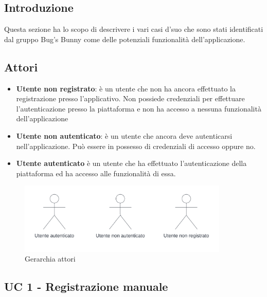 \subsection{Introduzione}
Questa sezione ha lo scopo di descrivere i vari casi d'suo che sono stati identificati dal gruppo Bug's Bunny 
come delle potenziali funzionalità dell'applicazione.

\subsection{Attori}
\begin{itemize}
    \item \textbf{Utente non registrato}: 
    è un utente che non ha ancora effettuato la registrazione presso l'applicativo. 
    Non possiede credenziali per effettuare l'autenticazione presso la piattaforma e non ha accesso a nessuna funzionalità dell'applicazione  
    \item \textbf{Utente non autenticato}: 
    è un utente che ancora deve autenticarsi nell'applicazione. Può essere in possesso di credenziali di accesso oppure no.
    \item \textbf{Utente autenticato}
    è un utente che ha effettuato l'autenticazione della piattaforma ed ha accesso alle funzionalità di essa.
\end{itemize}

\begin{figure}[!h]
    \includegraphics[width=10cm]{sezioni/Images/Actors.png}
    \centering
    \caption{Gerarchia attori}
\end{figure}
\newpage
    
\subsection{UC 1 - Registrazione manuale}

